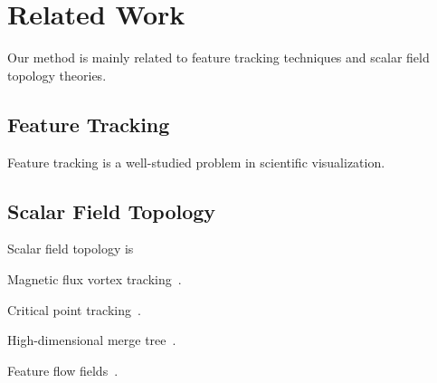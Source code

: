 \section{Related Work}

Our method is mainly related to feature tracking techniques and scalar field topology theories.  

\subsection{Feature Tracking}

Feature tracking is a well-studied problem in scientific visualization.  



\subsection{Scalar Field Topology}

Scalar field topology is 




Magnetic flux vortex tracking~\cite{GuoPPKG16, GuoPG17, PhillipsGPKG16, PhillipsPKG15}.

Critical point tracking~\cite{ReininghausKWH12}.

High-dimensional merge tree~\cite{OesterlingHWMS17}. 

Feature flow fields~\cite{TheiselS03}. 

